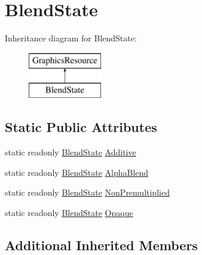 \hypertarget{classMicrosoft_1_1Xna_1_1Framework_1_1Graphics_1_1BlendState}{}\section{Blend\+State}
\label{classMicrosoft_1_1Xna_1_1Framework_1_1Graphics_1_1BlendState}
Inheritance diagram for Blend\+State\+:\begin{figure}[H]
\begin{center}
\leavevmode
\includegraphics[height=2.000000cm]{classMicrosoft_1_1Xna_1_1Framework_1_1Graphics_1_1BlendState}
\end{center}
\end{figure}
\subsection*{Static Public Attributes}
\begin{DoxyCompactItemize}
\item 
static readonly \hyperlink{classMicrosoft_1_1Xna_1_1Framework_1_1Graphics_1_1BlendState}{Blend\+State} \hyperlink{classMicrosoft_1_1Xna_1_1Framework_1_1Graphics_1_1BlendState_aed6743f4aae295940937b08b35781e10}{Additive}
\item 
static readonly \hyperlink{classMicrosoft_1_1Xna_1_1Framework_1_1Graphics_1_1BlendState}{Blend\+State} \hyperlink{classMicrosoft_1_1Xna_1_1Framework_1_1Graphics_1_1BlendState_a39a2e808839b700ad919c402dcada67e}{Alpha\+Blend}
\item 
static readonly \hyperlink{classMicrosoft_1_1Xna_1_1Framework_1_1Graphics_1_1BlendState}{Blend\+State} \hyperlink{classMicrosoft_1_1Xna_1_1Framework_1_1Graphics_1_1BlendState_aacbc58cf2f72c209da8c105a0cf822e8}{Non\+Premultiplied}
\item 
static readonly \hyperlink{classMicrosoft_1_1Xna_1_1Framework_1_1Graphics_1_1BlendState}{Blend\+State} \hyperlink{classMicrosoft_1_1Xna_1_1Framework_1_1Graphics_1_1BlendState_af8464c892cec46986d869076a0cda713}{Opaque}
\end{DoxyCompactItemize}
\subsection*{Additional Inherited Members}


